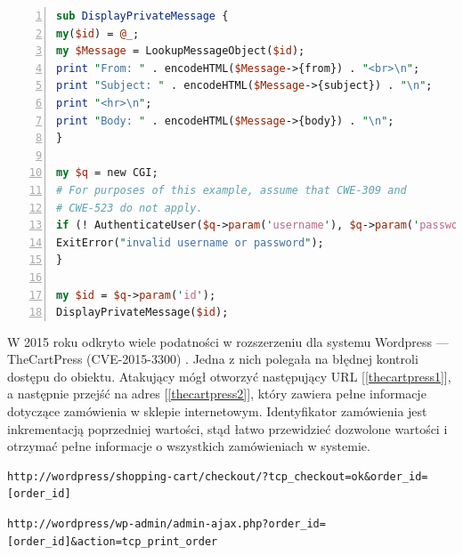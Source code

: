 \documentclass[11pt,a4paper,polish,thesis,oneside]{dcsbook}
\begin{document}
\begin{lstlisting}[language=perl,frame=single,caption=przykładowy kod podatny na bezpośrednie odwołanie \cite{directaccess},label=da01,numbers=left]
sub DisplayPrivateMessage {
my($id) = @_;
my $Message = LookupMessageObject($id);
print "From: " . encodeHTML($Message->{from}) . "<br>\n";
print "Subject: " . encodeHTML($Message->{subject}) . "\n";
print "<hr>\n";
print "Body: " . encodeHTML($Message->{body}) . "\n";
}

my $q = new CGI;
# For purposes of this example, assume that CWE-309 and
# CWE-523 do not apply.
if (! AuthenticateUser($q->param('username'), $q->param('password'))) {
ExitError("invalid username or password");
}

my $id = $q->param('id');
DisplayPrivateMessage($id);
\end{lstlisting}

W 2015 roku odkryto wiele podatności w rozszerzeniu dla systemu Wordpress --- TheCartPress (CVE-2015-3300) \cite{thecartpress}. Jedna z nich polegała na błędnej kontroli dostępu do obiektu. Atakujący mógł otworzyć następujący URL [\ref{thecartpress1}], a następnie przejść na adres [\ref{thecartpress2}], który zawiera pełne informacje dotyczące zamówienia w sklepie internetowym. Identyfikator zamówienia jest inkrementacją poprzedniej wartości, stąd łatwo przewidzieć dozwolone wartości i otrzymać pełne informacje o wszystkich zamówieniach w systemie.

\begin{lstlisting}[caption=adres URL zamówienia w systemie TheCartPress,label=thecartpress1]
http://wordpress/shopping-cart/checkout/?tcp_checkout=ok&order_id=[order_id]
\end{lstlisting}

\begin{lstlisting}[caption=adres URL przeznaczony dla administratora do podglądu zamówienia,label=thecartpress2]
http://wordpress/wp-admin/admin-ajax.php?order_id=[order_id]&action=tcp_print_order
\end{lstlisting}
\end{document}
